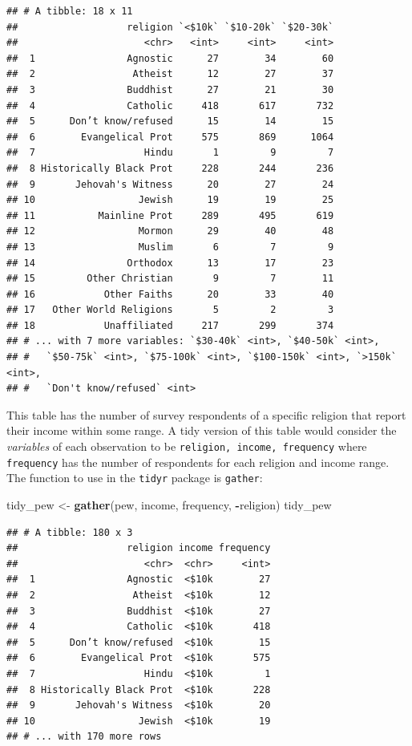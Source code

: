 \documentclass[12pt,]{book}
\newenvironment{Shaded}{\begin{snugshade}}{\end{snugshade}}
\newcommand{\KeywordTok}[1]{\textcolor[rgb]{0.13,0.29,0.53}{\textbf{#1}}}
\newcommand{\StringTok}[1]{\textcolor[rgb]{0.31,0.60,0.02}{#1}}
\newcommand{\OperatorTok}[1]{\textcolor[rgb]{0.81,0.36,0.00}{\textbf{#1}}}
\newcommand{\NormalTok}[1]{#1}
\theoremstyle{definition}
\theoremstyle{definition}
\theoremstyle{remark}
\begin{document}
\begin{verbatim}
## # A tibble: 18 x 11
##                   religion `<$10k` `$10-20k` `$20-30k`
##                      <chr>   <int>     <int>     <int>
##  1                Agnostic      27        34        60
##  2                 Atheist      12        27        37
##  3                Buddhist      27        21        30
##  4                Catholic     418       617       732
##  5      Don’t know/refused      15        14        15
##  6        Evangelical Prot     575       869      1064
##  7                   Hindu       1         9         7
##  8 Historically Black Prot     228       244       236
##  9       Jehovah's Witness      20        27        24
## 10                  Jewish      19        19        25
## 11           Mainline Prot     289       495       619
## 12                  Mormon      29        40        48
## 13                  Muslim       6         7         9
## 14                Orthodox      13        17        23
## 15         Other Christian       9         7        11
## 16            Other Faiths      20        33        40
## 17   Other World Religions       5         2         3
## 18            Unaffiliated     217       299       374
## # ... with 7 more variables: `$30-40k` <int>, `$40-50k` <int>,
## #   `$50-75k` <int>, `$75-100k` <int>, `$100-150k` <int>, `>150k` <int>,
## #   `Don't know/refused` <int>
\end{verbatim}

This table has the number of survey respondents of a specific religion
that report their income within some range. A tidy version of this table
would consider the \emph{variables} of each observation to be
\texttt{religion,\ income,\ frequency} where \texttt{frequency} has the
number of respondents for each religion and income range. The function
to use in the \texttt{tidyr} package is \texttt{gather}:

\begin{Shaded}
\begin{Highlighting}[]
\NormalTok{tidy_pew <-}\StringTok{ }\KeywordTok{gather}\NormalTok{(pew, income, frequency, }\OperatorTok{-}\NormalTok{religion)}
\NormalTok{tidy_pew}
\end{Highlighting}
\end{Shaded}

\begin{verbatim}
## # A tibble: 180 x 3
##                   religion income frequency
##                      <chr>  <chr>     <int>
##  1                Agnostic  <$10k        27
##  2                 Atheist  <$10k        12
##  3                Buddhist  <$10k        27
##  4                Catholic  <$10k       418
##  5      Don’t know/refused  <$10k        15
##  6        Evangelical Prot  <$10k       575
##  7                   Hindu  <$10k         1
##  8 Historically Black Prot  <$10k       228
##  9       Jehovah's Witness  <$10k        20
## 10                  Jewish  <$10k        19
## # ... with 170 more rows
\end{verbatim}
\end{document}
